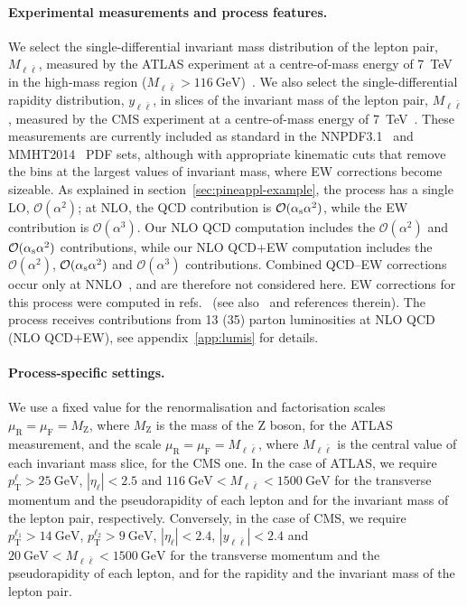 \paragraph{Experimental measurements and process features.}
We select the single-differential invariant mass distribution of the
lepton pair, $M_{\ell \bar\ell}$, measured by the ATLAS experiment at a centre-of-mass
energy of \SI{7}{\tera\electronvolt} in the high-mass region
($M_{\ell\bar\ell}>\SI{116}{\giga\electronvolt}$)~\cite{Aad:2013iua}.
We also select the single-differential rapidity distribution, $y_{\ell\bar\ell}$, in slices of
the invariant mass of the lepton pair, $M_{\ell\bar\ell}$,
measured by the CMS experiment at a centre-of-mass energy of
\SI{7}{\tera\electronvolt}~\cite{Chatrchyan:2013tia}.
These measurements are currently included as standard in the
NNPDF3.1~\cite{Ball:2017nwa} and MMHT2014~\cite{Harland-Lang:2014zoa} PDF sets,
although with appropriate kinematic cuts that remove the bins at the largest
values of invariant mass, where EW corrections become sizeable. As explained in
section~\ref{sec:pineappl-example}, 
the process has a single LO, $\mathcal{O}(\alpha^2)$; at NLO, the
QCD contribution is $\mathcal{O}(\alpha_\mathrm{s}\alpha^2)$, while the EW contribution
is $\mathcal{O}(\alpha^3)$. Our NLO QCD computation includes the
$\mathcal{O}(\alpha^2)$ and $\mathcal{O}(\alpha_\mathrm{s}\alpha^2)$ contributions, while
our NLO QCD+EW computation includes the $\mathcal{O}(\alpha^2)$, 
$\mathcal{O}(\alpha_\mathrm{s}\alpha^2)$ and $\mathcal{O}(\alpha^3)$ contributions.
Combined QCD--EW corrections occur only at NNLO~\cite{Buccioni:2020cfi}, and are therefore not
considered here. EW corrections for this process were computed in
refs.~\cite{Baur:2001ze,Arbuzov:2007db,Dittmaier:2009cr,Frederix:2018nkq} (see also~\cite{Alioli:2016fum} and references therein). The process receives contributions
from 13 (35) parton luminosities at NLO QCD (NLO QCD+EW),
see appendix~\ref{app:lumis} for details.

\paragraph{Process-specific settings.}
We use a fixed value for the renormalisation and factorisation scales $\mu_\mathrm{R}=\mu_\mathrm{F}=M_\mathrm{Z}$, where $M_\mathrm{Z}$ is
the mass of the Z boson, for the ATLAS measurement, and the scale
$\mu_\mathrm{R}=\mu_\mathrm{F}=M_{\ell\bar\ell}$, where $M_{\ell\bar\ell}$ is the central value of each
invariant mass slice, for the CMS one. In the case of ATLAS, we require $p_\mathrm{T}^\ell>\SI{25}{\giga\electronvolt}$,
$|\eta_\ell|<2.5$ and $\SI{116}{\giga\electronvolt}<M_{\ell\bar\ell}<\SI{1500}{\giga\electronvolt}$ for the transverse
momentum and the pseudorapidity of each lepton and for the invariant mass of the
lepton pair, respectively. Conversely, in the case of CMS, we require $p_\mathrm{T}^{\ell_1}>\SI{14}{\giga\electronvolt}$, $p_\mathrm{T}^{\ell_2}>\SI{9}{\giga\electronvolt}$,
$|\eta_\ell|<2.4$, $|y_{\ell\bar\ell}|<2.4$ and $\SI{20}{\giga\electronvolt}<M_{\ell\bar\ell}<\SI{1500}{\giga\electronvolt}$
for the transverse momentum and the pseudorapidity of each lepton, and for the
rapidity and the invariant mass of the lepton pair.

